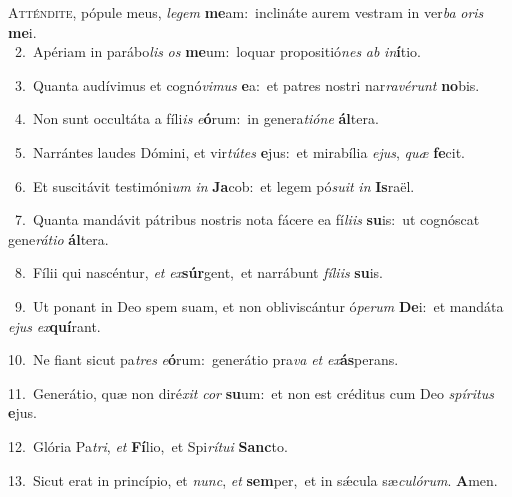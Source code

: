 \lettrine{\initial\textcolor{\initialcolor}{A}}{tténdite,} pópule meus, \textit{le}\-\textit{gem} \textbf{me}\-am:~\star inclináte aurem vestram in ver\textit{ba} \textit{o}\-\textit{ris} \textbf{me}\-i.\\
{\numbfont\textcolor{\numbcolor}{~2.}}~Apériam in parábo\textit{lis} \textit{os} \textbf{me}\-um:~\star loquar propositió\textit{nes} \textit{ab} \textit{in}\-\textbf{í}tio.\par
{\numbfont\textcolor{\numbcolor}{~3.}}~Quanta audívimus et cognó\-\textit{vi}\-\textit{mus} \textbf{e}\-a:~\star et patres nostri nar\-\textit{ra}\-\textit{vé}\textit{runt} \textbf{no}\-bis.\par
{\numbfont\textcolor{\numbcolor}{~4.}}~Non sunt occultáta a fíli\textit{is} \textit{e}\-\textbf{ó}rum:~\star in genera\-\textit{ti}\-\textit{ó}\textit{ne} \textbf{ál}\-tera.\par
{\numbfont\textcolor{\numbcolor}{~5.}}~Narrántes laudes Dómini, et vir\-\textit{tú}\-\textit{tes} \textbf{e}\-jus:~\star et mirabília \textit{e}\-\textit{jus}, \textit{quæ} \textbf{fe}\-cit.\par
{\numbfont\textcolor{\numbcolor}{~6.}}~Et suscitávit testimóni\textit{um} \textit{in} \textbf{Ja}\-cob:~\star et legem pó\-\textit{su}\-\textit{it} \textit{in} \textbf{Is}\-raël.\par
{\numbfont\textcolor{\numbcolor}{~7.}}~Quanta mandávit pátribus nostris nota fácere ea fí\-\textit{li}\-\textit{is} \textbf{su}\-is:~\star ut cognóscat gene\-\textit{rá}\-\textit{ti}\textit{o} \textbf{ál}\-tera.\par
{\numbfont\textcolor{\numbcolor}{~8.}}~Fílii qui nascéntur, \textit{et} \textit{ex}\-\textbf{súr}gent,~\star et narrábunt \textit{fí}\-\textit{li}\textit{is} \textbf{su}\-is.\par
{\numbfont\textcolor{\numbcolor}{~9.}}~Ut ponant in Deo spem suam, et non obliviscántur ó\-\textit{pe}\-\textit{rum} \textbf{De}\-i:~\star et mandáta \textit{e}\-\textit{jus} \textit{ex}\-\textbf{quí}rant.\par
{\numbfont\textcolor{\numbcolor}{10.}}~Ne fiant sicut pa\textit{tres} \textit{e}\-\textbf{ó}rum:~\star generátio pra\textit{va} \textit{et} \textit{ex}\-\textbf{ás}perans.\par
{\numbfont\textcolor{\numbcolor}{11.}}~Generátio, quæ non diré\textit{xit} \textit{cor} \textbf{su}\-um:~\star et non est créditus cum Deo \textit{spí}\-\textit{ri}\textit{tus} \textbf{e}\-jus.\par
{\numbfont\textcolor{\numbcolor}{12.}}~Glória Pa\-\textit{tri}\-, \textit{et} \textbf{Fí}\-lio,~\star et Spi\-\textit{rí}\-\textit{tu}\textit{i} \textbf{Sanc}\-to.\par
{\numbfont\textcolor{\numbcolor}{13.}}~Sicut erat in princípio, et \textit{nunc}\-, \textit{et} \textbf{sem}\-per,~\star et in sǽcula sæ\-\textit{cu}\-\textit{ló}\textit{rum}. \textbf{A}\-men.\par
